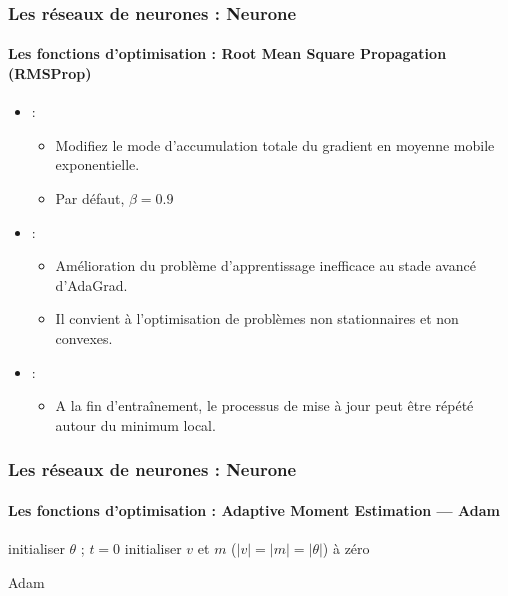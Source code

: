\documentclass[xcolor=table]{beamer}
\begin{document}
\begin{frame}
\frametitle{Les réseaux de neurones : Neurone}
\framesubtitle{Les fonctions d'optimisation : Root Mean Square Propagation (RMSProp)}

\begin{itemize}
	\item {} : 
	\begin{itemize}
		\item Modifiez le mode d'accumulation totale du gradient en moyenne mobile exponentielle.
		\item Par défaut, $\beta = 0.9$ 
	\end{itemize}
	\item {} : 
	\begin{itemize}
		\item Amélioration du problème d'apprentissage inefficace au stade avancé d'AdaGrad. 
		\item Il convient à l'optimisation de problèmes non stationnaires et non convexes.
	\end{itemize}
	\item {} : 
	\begin{itemize}
		\item A la fin d'entraînement, le processus de mise à jour peut être répété autour du minimum local.
	\end{itemize}
\end{itemize}

\end{frame}

\begin{frame}
\frametitle{Les réseaux de neurones : Neurone}
\framesubtitle{Les fonctions d'optimisation : Adaptive Moment Estimation — Adam}

\begin{algorithm}[H]
	\KwResult{$ \theta $}
	initialiser $ \theta $ ; $ t = 0 $\;
	initialiser $v$ et $m$ ($|v| = |m| = |\theta|$) à zéro\;
	\caption{Adam \cite{2015-kingma-ba}}
\end{algorithm}

\end{frame}
\end{document}
